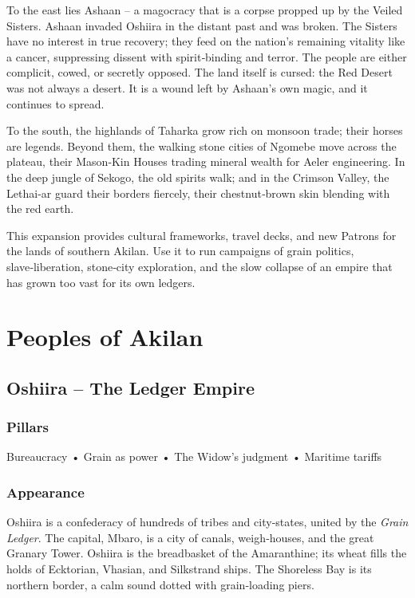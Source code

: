 \documentclass[11pt]{book}
\begin{document}
To the east lies Ashaan -- a magocracy that is a corpse propped up by the Veiled Sisters. Ashaan invaded Oshiira in the distant past and was broken. The Sisters have no interest in true recovery; they feed on the nation's remaining vitality like a cancer, suppressing dissent with spirit‑binding and terror. The people are either complicit, cowed, or secretly opposed. The land itself is cursed: the Red Desert was not always a desert. It is a wound left by Ashaan's own magic, and it continues to spread.

To the south, the highlands of Taharka grow rich on monsoon trade; their horses are legends. Beyond them, the walking stone cities of Ngomebe move across the plateau, their Mason‑Kin Houses trading mineral wealth for Aeler engineering. In the deep jungle of Sekogo, the old spirits walk; and in the Crimson Valley, the Lethai‑ar guard their borders fiercely, their chestnut‑brown skin blending with the red earth.

This expansion provides cultural frameworks, travel decks, and new Patrons for the lands of southern Akilan. Use it to run campaigns of grain politics, slave‑liberation, stone‑city exploration, and the slow collapse of an empire that has grown too vast for its own ledgers.

\chapter{Peoples of Akilan}

\section{Oshiira -- The Ledger Empire}

\subsection*{Pillars}
Bureaucracy • Grain as power • The Widow's judgment • Maritime tariffs

\subsection*{Appearance}
Oshiira is a confederacy of hundreds of tribes and city‑states, united by the \textit{Grain Ledger}. The capital, Mbaro, is a city of canals, weigh‑houses, and the great Granary Tower. Oshiira is the breadbasket of the Amaranthine; its wheat fills the holds of Ecktorian, Vhasian, and Silkstrand ships. The Shoreless Bay is its northern border, a calm sound dotted with grain‑loading piers.
\end{document}
